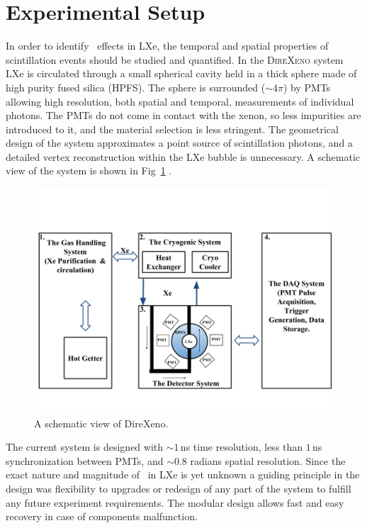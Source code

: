 \section{Experimental Setup}


In order to identify \superradiance\ effects in LXe, the temporal and spatial properties of scintillation events should be studied and quantified. In the \textsc{DireXeno} system LXe is circulated through a small spherical cavity held in a thick sphere made of high purity fused silica (HPFS). The sphere is surrounded ($\sim4\pi$) by PMTs allowing high resolution, both spatial and temporal, measurements of individual photons. The PMTs do not come in contact with the xenon, so less impurities are introduced to it, and the material selection is less stringent. The geometrical design of the system approximates a point  source of scintillation photons, and a detailed vertex reconstruction within the LXe bubble is unnecessary. A schematic view of the system is shown in Fig~\ref{fig:detSch} . 

\begin{figure}[h]
\centerline{\includegraphics[width=0.8\linewidth]{DetSch.png}}
\caption{A schematic view of DireXeno.}
\label{fig:detSch}
\end{figure}


The current system is designed with $\sim1$\,ns time resolution, less than $1$\,ns synchronization between PMTs, and $\sim0.8$ radians spatial resolution. Since the exact nature and magnitude of \superradiance\ in LXe is yet unknown a guiding principle in the design was flexibility to upgrades or redesign of any part of the system to fulfill any future experiment requirements. The modular design allows fast and easy recovery in case of components malfunction.

